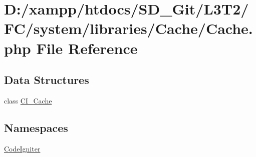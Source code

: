 \hypertarget{system_2libraries_2_cache_2_cache_8php}{}\section{D\+:/xampp/htdocs/\+S\+D\+\_\+\+Git/\+L3\+T2/\+F\+C/system/libraries/\+Cache/\+Cache.php File Reference}
\label{system_2libraries_2_cache_2_cache_8php}
\subsection*{Data Structures}
\begin{DoxyCompactItemize}
\item 
class \hyperlink{class_c_i___cache}{C\+I\+\_\+\+Cache}
\end{DoxyCompactItemize}
\subsection*{Namespaces}
\begin{DoxyCompactItemize}
\item 
 \hyperlink{namespace_code_igniter}{Code\+Igniter}
\end{DoxyCompactItemize}
